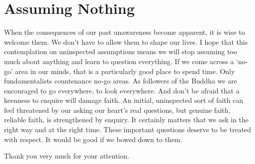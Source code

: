 \section{Assuming Nothing}

When the consequences of our past unawareness become apparent, it is
wise to welcome them. We don’t have to allow them to shape our lives. I
hope that this contemplation on uninspected assumptions means we will
stop assuming too much about anything and learn to question everything.
If we come across a ‘no-go’ area in our minds, that is a particularly
good place to spend time. Only fundamentalists countenance no-go areas.
As followers of the Buddha we are encouraged to go everywhere, to look
everywhere. And don’t be afraid that a keenness to enquire will damage
faith. An initial, uninspected sort of faith can feel threatened by our
asking our heart’s real questions, but genuine faith, reliable faith, is
strengthened by enquiry. It certainly matters that we ask in the right
way and at the right time. These important questions deserve to be
treated with respect. It would be good if we bowed down to them.

Thank you very much for your attention.

